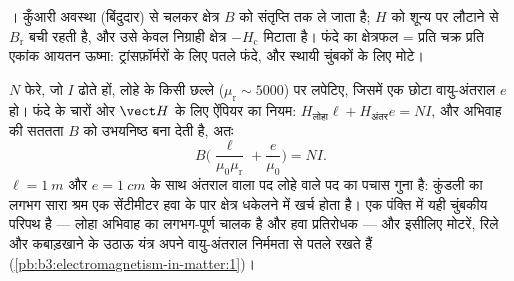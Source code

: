 \begin{omfigure}

{\small {}। कुँआरी अवस्था (बिंदुदार) से चलकर
क्षेत्र $B$ को संतृप्ति तक ले जाता है; $H$ को शून्य पर लौटाने से
 $B_{\text{r}}$ बची रहती है, और उसे केवल निग्राही क्षेत्र
$-H_{\text{c}}$ मिटाता है। फंदे का क्षेत्रफल = प्रति चक्र प्रति एकांक
आयतन ऊष्मा: ट्रांसफ़ॉर्मरों के लिए पतले फंदे, और स्थायी चुंबकों के
लिए मोटे।}
\end{omfigure}

\begin{example}[लोहे के क्रोड वाला विद्युत्-चुंबक]\label{ex:b3:electromagnetism-in-matter:electromagnet}
$N$ फेरे, जो $I$ ढोते हों, लोहे के किसी छल्ले ($\mu_{\text{r}}
\sim 5000$) पर लपेटिए, जिसमें एक छोटा वायु-अंतराल $e$ हो।
फंदे के चारों ओर $\vect H$ के लिए ऐंपियर का नियम:
$H_{\text{लोहा}}\ell + H_{\text{अंतर}}e = NI$, और
अभिवाह की सततता $B$ को उभयनिष्ठ बना देती है, अतः
\[
B\Big(\frac{\ell}{\mu_0\mu_{\text{r}}} + \frac{e}{\mu_0}\Big) = NI .
\]
$\ell = \qty{1}{m}$ और $e = \qty{1}{cm}$ के साथ अंतराल वाला पद लोहे
वाले पद का पचास गुना है: कुंडली का लगभग सारा श्रम एक सेंटीमीटर हवा के
पार क्षेत्र धकेलने में खर्च होता है। एक पंक्ति में यही
चुंबकीय परिपथ है --- लोहा अभिवाह का लगभग-पूर्ण चालक है और हवा
प्रतिरोधक --- और इसीलिए मोटरें, रिले और कबाड़खाने के उठाऊ यंत्र अपने
वायु-अंतराल निर्ममता से पतले रखते हैं
(\cref{pb:b3:electromagnetism-in-matter:1})।
\end{example}

